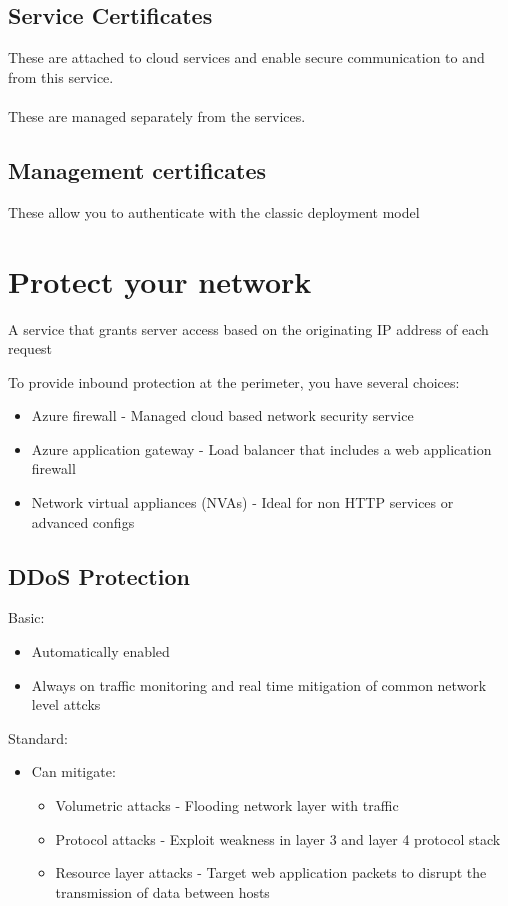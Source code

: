\documentclass{article}[18pt]
\begin{document}
\subsection{Service Certificates}
These are attached to cloud services and enable secure communication to and from this service.\\
\\
These are managed separately from the services.
\subsection{Management certificates}
These allow you to authenticate with the classic deployment model 
\section{Protect your network}
\begin{definition}[Firewall]
	A service that grants server access based on the originating IP address of each request
\end{definition}
To provide inbound protection at the perimeter, you have several choices:
\begin{itemize}
	\item Azure firewall - Managed cloud based network security service
	\item Azure application gateway - Load balancer that includes a web application firewall
	\item Network virtual appliances (NVAs) - Ideal for non HTTP services or advanced configs
\end{itemize}
\subsection{DDoS Protection}
Basic:
\begin{itemize}
	\item Automatically enabled
	\item Always on traffic monitoring and real time mitigation of common network level attcks
\end{itemize}
Standard:
\begin{itemize}
	\item Can mitigate:
	\begin{itemize}
		\item Volumetric attacks - Flooding network layer with traffic
		\item Protocol attacks - Exploit weakness in layer 3 and layer 4 protocol stack
		\item Resource layer attacks - Target web application packets to disrupt the transmission of data between hosts
	\end{itemize}
\end{itemize}
\end{document}
